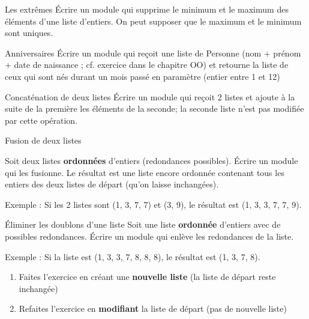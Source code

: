 \begin{Exercice}{Les extrêmes}
		Écrire un module qui supprime le minimum et le maximum des éléments
		d’une liste d’entiers. On peut supposer que le maximum et le minimum
		sont uniques.
\end{Exercice}

\begin{Exercice}{Anniversaires}
		Écrire un module qui reçoit une liste de Personne (nom + prénom + date
		de naissance ; cf. exercice dans le chapitre OO) et retourne la liste
		de ceux qui sont nés durant un mois passé en paramètre (entier entre 1
		et 12)
\end{Exercice}
	
\begin{Exercice}{Concaténation de deux listes}
		Écrire un module qui reçoit 2 listes et ajoute
		à la suite de la première les éléments de la seconde; la seconde liste
		n'est pas modifiée par cette opération.
\end{Exercice}

\begin{Exercice}{Fusion de deux listes}
	
		Soit deux listes \textbf{ordonnées}
		d'entiers (redondances possibles). Écrire un module
		qui les fusionne. Le résultat est une liste encore ordonnée contenant
		tous les entiers des deux listes de départ (qu'on
		laisse inchangées).

		Exemple : Si les 2 listes sont (1, 3, 7, 7) et (3, 9), 
		le résultat est (1, 3, 3, 7, 7, 9).
\end{Exercice}

\begin{Exercice}{Éliminer les doublons d'une liste}
		Soit une liste \textbf{ordonnée} 
		d'entiers avec de possibles redondances. Écrire un
		module qui enlève les redondances de la liste.
				
		Exemple : Si la liste est (1, 3, 3, 7, 8, 8, 8),
		le résultat est (1, 3, 7, 8).

		\begin{enumerate}[label=\alph*)]
			\item 
				Faites l'exercice en créant une \textbf{nouvelle
				liste} (la liste de départ reste inchangée)
			\item 
				Refaites l'exercice en \textbf{modifiant}
				la liste de départ (pas de nouvelle liste)
		\end{enumerate}
\end{Exercice}

